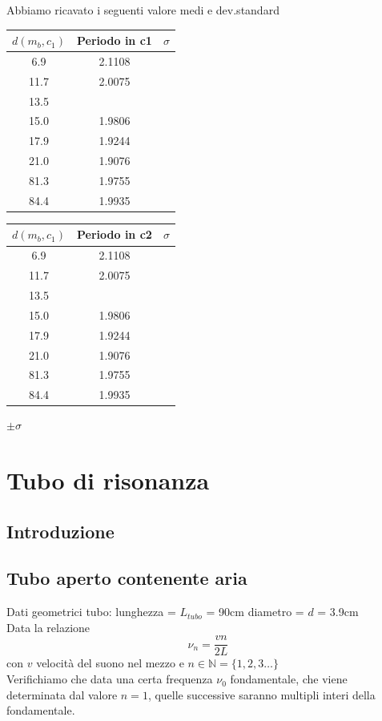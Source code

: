 \documentclass[a4paper,10pt]{report}
\begin{document}
Abbiamo ricavato i seguenti valore medi e dev.standard 
\begin{tabular}{|c|c|c|}
$d(m_b,c_1)$ & Periodo in c1 & $\sigma$ \\
\midrule
6.9 & 2.1108 &\\
11.7 & 2.0075 &\\
13.5 & &\\
15.0 &  1.9806 &\\
17.9 & 1.9244 &\\
21.0 & 1.9076 &\\
81.3 & 1.9755&\\
84.4 & 1.9935&\\
\end{tabular}

\begin{tabular}{|c|c|c|}
$d(m_b,c_1)$ & Periodo in c2 & $\sigma$ \\
\midrule
6.9 & 2.1108 &\\
11.7 & 2.0075 &\\
13.5 & &\\
15.0 &  1.9806 &\\
17.9 & 1.9244 &\\
21.0 & 1.9076 &\\
81.3 & 1.9755&\\
84.4 & 1.9935&\\
\end{tabular}

$\pm\sigma$

\chapter{Tubo di risonanza}
\section{Introduzione}
\section{Tubo aperto contenente aria}
Dati geometrici tubo:
lunghezza = $L_{tubo}$ = 90cm
diametro = $d$ = 3.9cm
\\
Data la relazione
\begin{equation} \label{eq:gianni}
\nu_n= \frac{vn}{2L}		
\end{equation}
 con $v$ velocità del suono nel mezzo e $n \in \mathbb{N} = \{1,2,3\dots\}$ 
\\

Verifichiamo che data una certa frequenza $\nu_0$ fondamentale, che viene determinata dal valore $n=1$, quelle successive saranno multipli interi della fondamentale. 
\end{document}
